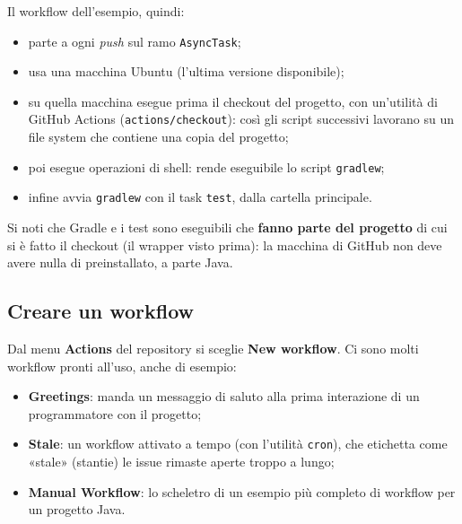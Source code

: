 Il workflow dell'esempio, quindi:

\begin{itemize}
  \item parte a ogni \textit{push} sul ramo \texttt{AsyncTask};
  \item usa una macchina Ubuntu (l'ultima versione disponibile);
  \item su quella macchina esegue prima il checkout del progetto, con un'utilità di GitHub Actions
        (\texttt{actions/checkout}): così gli script successivi lavorano su un file system che contiene una copia del
        progetto;
  \item poi esegue operazioni di shell: rende eseguibile lo script \texttt{gradlew};
  \item infine avvia \texttt{gradlew} con il task \texttt{test}, dalla cartella principale.
\end{itemize}

Si noti che Gradle e i test sono eseguibili che \textbf{fanno parte del progetto} di cui si è fatto il checkout (il
wrapper visto prima): la macchina di GitHub non deve avere nulla di preinstallato, a parte Java.


\subsection{Creare un workflow}

Dal menu \textbf{Actions} del repository si sceglie \textbf{New workflow}. Ci sono molti workflow pronti all'uso,
anche di esempio:

\begin{itemize}
  \item \textbf{Greetings}: manda un messaggio di saluto alla prima interazione di un programmatore con il progetto;
  \item \textbf{Stale}: un workflow attivato a tempo (con l'utilità \texttt{cron}), che etichetta come «stale»
        (stantie) le issue rimaste aperte troppo a lungo;
  \item \textbf{Manual Workflow}: lo scheletro di un esempio più completo di workflow per un progetto Java.
\end{itemize}

